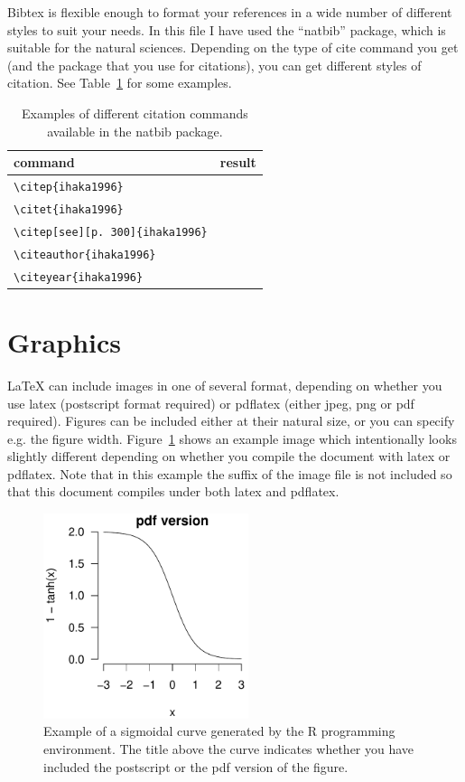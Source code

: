\documentclass{article}
\providecommand*{\latex}{\LaTeX\xspace}
\begin{document}
Bibtex is flexible enough to format your references in a wide number
of different styles to suit your needs.  In this file I have used the
``natbib'' package, which is suitable for the natural sciences.
Depending on the type of cite command you get (and the package that
you use for citations), you can get different styles of citation.  See
Table~\ref{tab:cite} for some examples.

\begin{table}
  \centering
  \begin{tabular}{ll}
    \hline
    command                               & result                 \\ \hline
    \verb+\citep{ihaka1996}+              & \citep{ihaka1996}      \\
    \verb+\citet{ihaka1996}+              & \citet{ihaka1996}      \\
    \verb+\citep[see][p. 300]{ihaka1996}+ &
    \citep[see][p. 300]{ihaka1996}
    \\
    \verb+\citeauthor{ihaka1996}+         & \citeauthor{ihaka1996}
    \\
    \verb+\citeyear{ihaka1996}+           & \citeyear{ihaka1996}
    \\
    \hline
  \end{tabular}
  \caption{Examples of different citation commands available in the
    natbib package.}
  \label{tab:cite}
\end{table}


\section{Graphics}
\label{sec:graphics}

\latex can include images in one of several format, depending on
whether you use latex (postscript format required) or pdflatex (either
jpeg, png or pdf required).  Figures can be included either at their
natural size, or you can specify e.g. the figure width.
Figure~\ref{fig:example} shows an example image which intentionally
looks slightly different depending on whether you compile the document
with latex or pdflatex.  Note that in this example the suffix of the
image file is not included so that this document compiles under both
latex and pdflatex.

\begin{figure}
  \centering
  \includegraphics[width=6cm]{sigmoid}
  \caption{Example of a sigmoidal curve generated by the R programming
    environment.  The title above the curve indicates whether you have
    included the postscript or the pdf version of the figure.}
  \label{fig:example}
\end{figure}
\end{document}

